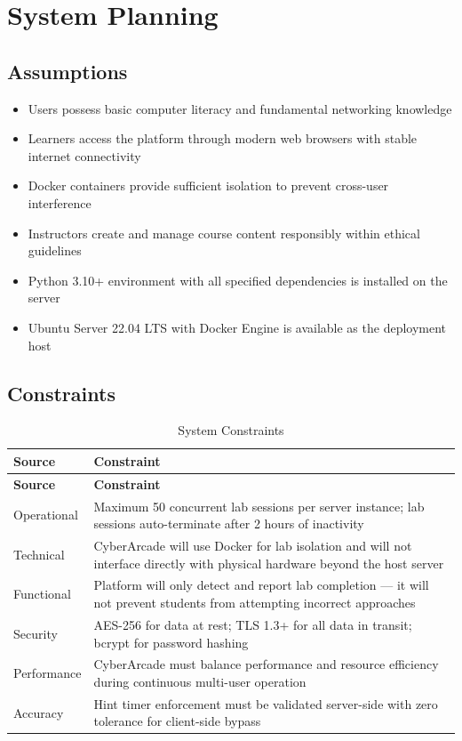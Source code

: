 \documentclass[12pt,a4paper]{report}
\newcommand{\hrow}{}
\newcommand{\hcell}[1]{\textbf{#1}}
\newcommand{\altrow}{}
\begin{document}
\section{System Planning}

\subsection{Assumptions}
\begin{itemize}
  \item Users possess basic computer literacy and fundamental networking knowledge
  \item Learners access the platform through modern web browsers with stable internet connectivity
  \item Docker containers provide sufficient isolation to prevent cross-user interference
  \item Instructors create and manage course content responsibly within ethical guidelines
  \item Python 3.10+ environment with all specified dependencies is installed on the server
  \item Ubuntu Server 22.04 LTS with Docker Engine is available as the deployment host
\end{itemize}

\subsection{Constraints}

\begin{longtable}{|L{2.8cm}|L{11.2cm}|}
\caption{System Constraints}\label{tab:constraints}\\
\hline
\hrow \hcell{Source} & \hcell{Constraint} \\
\hline
\endfirsthead
\hline
\hrow \hcell{Source} & \hcell{Constraint} \\
\hline
\endhead
Operational & Maximum 50 concurrent lab sessions per server instance; lab sessions auto-terminate after 2 hours of inactivity \\\hline
\altrow Technical & CyberArcade will use Docker for lab isolation and will not interface directly with physical hardware beyond the host server \\\hline
Functional & Platform will only detect and report lab completion --- it will not prevent students from attempting incorrect approaches \\\hline
\altrow Security & AES-256 for data at rest; TLS 1.3+ for all data in transit; bcrypt for password hashing \\\hline
Performance & CyberArcade must balance performance and resource efficiency during continuous multi-user operation \\\hline
\altrow Accuracy & Hint timer enforcement must be validated server-side with zero tolerance for client-side bypass \\\hline
\end{longtable}
\end{document}
